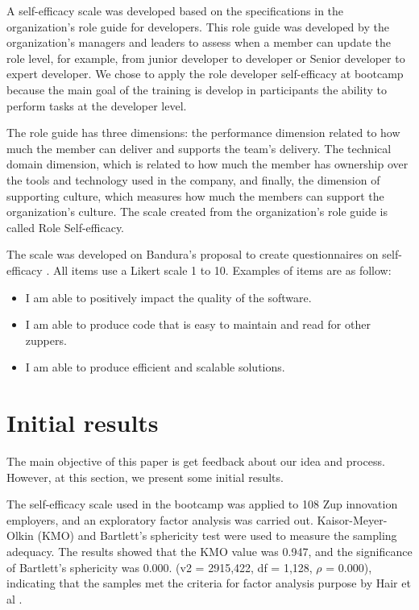 \documentclass[10pt, conference]{IEEEtran}
\begin{document}
A  self-efficacy scale was developed based on the specifications in the organization's role guide for developers. This role guide was developed by the organization's managers and leaders to assess when a member can update the role level, for example, from junior developer to developer or Senior developer to expert developer. We chose to apply the role developer self-efficacy at bootcamp because the main goal of the training is develop in participants the ability to perform tasks at the developer level.

The role guide has three dimensions: the performance dimension related to how much the member can deliver and supports the team's delivery. The technical domain dimension, which is related to how much the member has ownership over the tools and technology used in the company, and finally, the dimension of supporting culture, which measures how much the members can support the organization's culture. The scale created from the organization's role guide is called Role Self-efficacy.

The scale was developed on Bandura's proposal to create questionnaires on self-efficacy \cite{bandura2010self}. All items use a Likert scale 1 to 10. Examples of items are as follow:


\begin{itemize}
\item I am able to positively impact the quality of the software.
\item I am able to produce code that is easy to maintain and read for other zuppers.
\item I am able to produce efficient and scalable solutions.
\end{itemize}


\section{Initial results}

The main objective of this paper is get feedback about our idea and process. However, at this section, we present some initial results.


The self-efficacy scale used in the bootcamp was applied to 108 Zup innovation employers, and an exploratory factor analysis was carried out.
Kaisor-Meyer-Olkin (KMO) and Bartlett’s sphericity test were used to
measure the sampling adequacy. The results showed that the KMO value was 0.947, and the significance of Bartlett’s sphericity was 0.000. (v2 = 2915,422, df = 1,128,
$\rho$ = 0.000), indicating that the samples met the criteria for
factor analysis purpose by Hair et al \cite{hair2009multivariate}.
\end{document}
